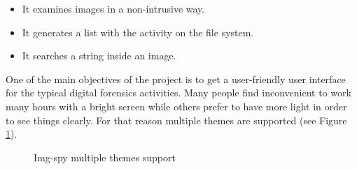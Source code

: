 \begin{itemize}
	\item[] 
	It examines images in a non-intrusive way.

	\item[] 
	It generates a list with the activity on the file system.

	\item[] 
	It searches a string inside an image.

\end{itemize}

One of the main objectives of the project is to get a user-friendly user interface for the typical digital forensics activities. Many
people find inconvenient to work many hours with a bright screen while others
prefer to have more light in order to see things clearly. For that reason
multiple themes are supported (see Figure \ref{F:img-spy-multi-theme}). 

\begin{figure}[htb]
	\begin{center}
		\begin{subfigmatrix}{2}
		\end{subfigmatrix}
		\caption{Img-spy  multiple themes support}
		\label{F:img-spy-multi-theme}
	\end{center}
\end{figure}

